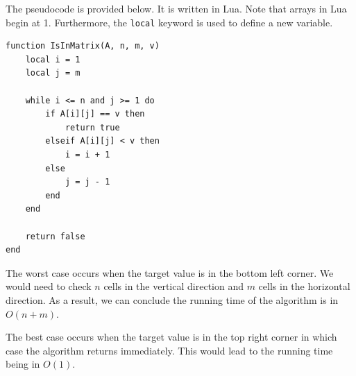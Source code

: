 \documentclass[11pt, letterpaper, titlepage]{article}
\begin{document}
The pseudocode is provided below. It is written in Lua. Note that arrays in Lua begin at 1. Furthermore, the \texttt{local} keyword is used to define a new variable.
\begin{verbatim}
function IsInMatrix(A, n, m, v)
    local i = 1
    local j = m
    
    while i <= n and j >= 1 do
        if A[i][j] == v then
            return true
        elseif A[i][j] < v then
            i = i + 1
        else
            j = j - 1
        end
    end
    
    return false
end
\end{verbatim}

The worst case occurs when the target value is in the bottom left corner. We would need to check $n$ cells in the vertical direction and $m$ cells in the horizontal direction. As a result, we can conclude the running time of the algorithm is in $O(n + m)$.

The best case occurs when the target value is in the top right corner in which case the algorithm returns immediately. This would lead to the running time being in $O(1)$.
\end{document}
